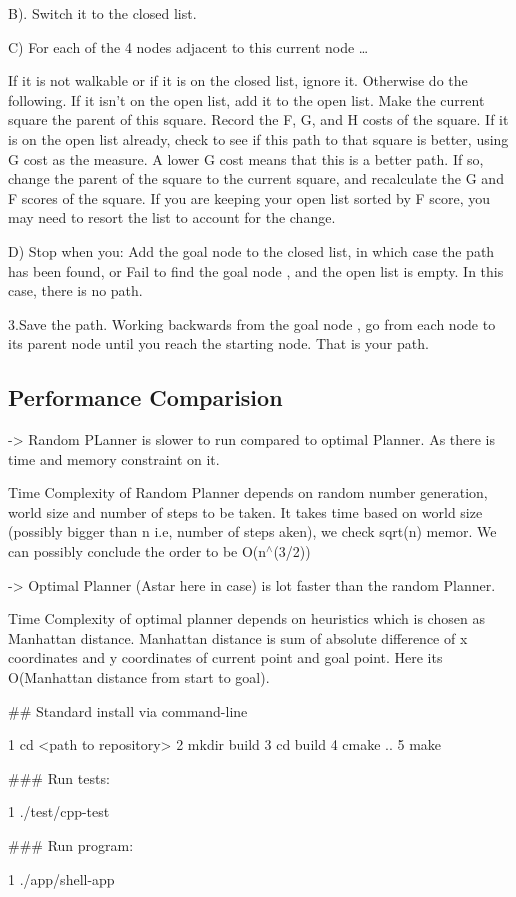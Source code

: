 B). Switch it to the closed list.

C) For each of the 4 nodes adjacent to this current node …

If it is not walkable or if it is on the closed list, ignore it. Otherwise do the following. If it isn’t on the open list, add it to the open list. Make the current square the parent of this square. Record the F, G, and H costs of the square. If it is on the open list already, check to see if this path to that square is better, using G cost as the measure. A lower G cost means that this is a better path. If so, change the parent of the square to the current square, and recalculate the G and F scores of the square. If you are keeping your open list sorted by F score, you may need to resort the list to account for the change.

D) Stop when you\+: Add the goal node to the closed list, in which case the path has been found, or Fail to find the goal node , and the open list is empty. In this case, there is no path.

3.\+Save the path. Working backwards from the goal node , go from each node to its parent node until you reach the starting node. That is your path.

\subsection*{Performance Comparision}

\begin{DoxyVerb}-> Random PLanner is slower to run compared to optimal Planner. As there is time and 
    memory constraint on it.
\end{DoxyVerb}
 Time Complexity of Random Planner depends on random number generation, world size and number of steps to be taken. It takes time based on world size (possibly bigger than n i.\+e, number of steps aken), we check sqrt(n) memor. We can possibly conclude the order to be O(n$^\wedge$(3/2)) \begin{DoxyVerb}-> Optimal Planner (Astar here in case) is lot faster than the random Planner. 
\end{DoxyVerb}
 Time Complexity of optimal planner depends on heuristics which is chosen as Manhattan distance. Manhattan distance is sum of absolute difference of x coordinates and y coordinates of current point and goal point. Here its O(\+Manhattan distance from start to goal).

\#\# Standard install via command-\/line 
\begin{DoxyCode}
1 cd <path to repository>
2 mkdir build
3 cd build
4 cmake ..
5 make
\end{DoxyCode}
 \#\#\# Run tests\+: 
\begin{DoxyCode}
1 ./test/cpp-test
\end{DoxyCode}
 \#\#\# Run program\+: 
\begin{DoxyCode}
1 ./app/shell-app
\end{DoxyCode}



